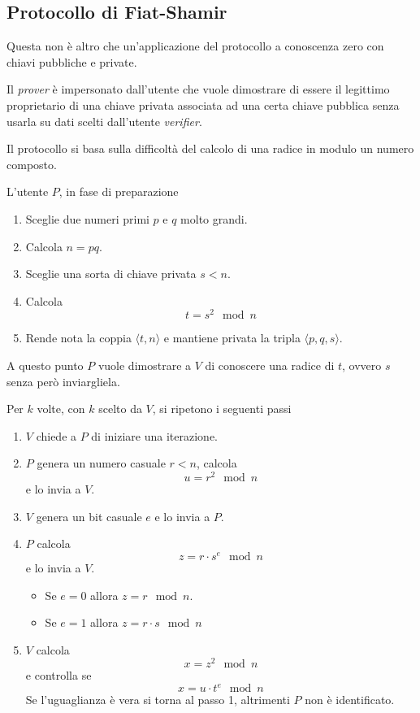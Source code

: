 \subsection{Protocollo di Fiat-Shamir}
Questa non \`e altro che un'applicazione del protocollo a conoscenza zero con chiavi pubbliche e private.

Il \emph{prover} \`e impersonato dall'utente che vuole dimostrare di essere il legittimo proprietario di una chiave
privata associata ad una certa chiave pubblica senza usarla su dati scelti dall'utente \emph{verifier}.

Il protocollo si basa sulla difficolt\`a del calcolo di una radice in modulo un numero composto.

L'utente $P$, in fase di preparazione
\begin{enumerate}
	\item Sceglie due numeri primi $p$ e $q$ molto grandi.
	\item Calcola $n = pq$.
	\item Sceglie una sorta di chiave privata $s < n$.
	\item Calcola
	      \[ t = s^2 \mod{n} \]
	\item Rende nota la coppia $\langle t, n \rangle$ e mantiene privata la tripla $\langle p, q, s \rangle$.
\end{enumerate}
A questo punto $P$ vuole dimostrare a $V$ di conoscere una radice di $t$, ovvero $s$ senza per\`o inviargliela.

Per $k$ volte, con $k$ scelto da $V$, si ripetono i seguenti passi
\begin{enumerate}
	\item $V$ chiede a $P$ di iniziare una iterazione.
	\item $P$ genera un numero casuale $r < n$, calcola
	      \[ u = r^2 \mod{n} \]
	      e lo invia a $V$.
	\item $V$ genera un bit casuale $e$ e lo invia a $P$.
	\item $P$ calcola
	      \[ z = r \cdot s^e \mod{n} \]
	      e lo invia a $V$.
	      \begin{itemize}
		      \item Se $e = 0$ allora $z = r \mod{n}$.
		      \item Se $e = 1$ allora $z = r \cdot s \mod{n}$
	      \end{itemize}
	\item $V$ calcola
	      \[ x = z^2 \mod{n} \]
	      e controlla se
	      \[ x = u \cdot t^e \mod{n} \]
	      Se l'uguaglianza \`e vera si torna al passo 1, altrimenti $P$ non \`e identificato.
\end{enumerate}

